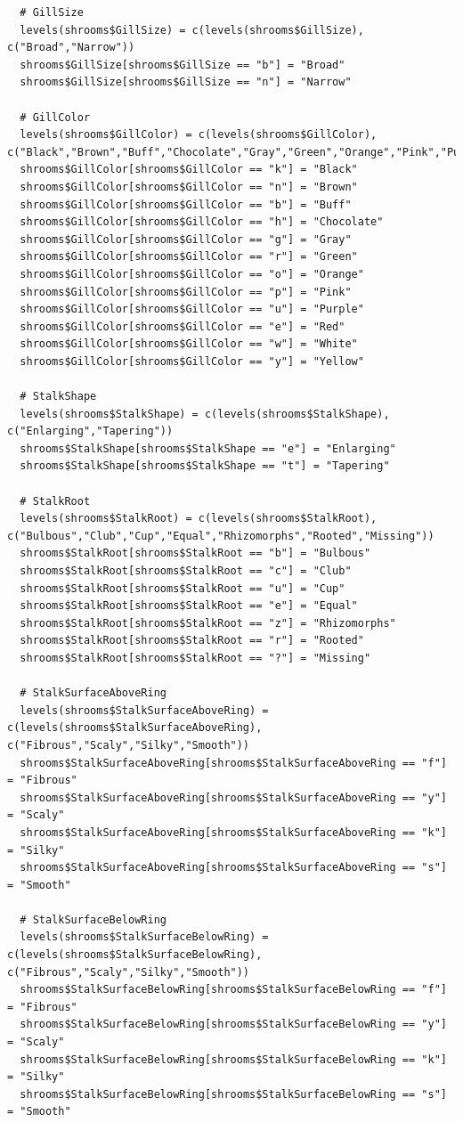\documentclass[10pt  ,usenames, dvipsnames]{article}\usepackage[]{graphicx}\usepackage[]{color}
\begin{document}
\begin{lstlisting}
  # GillSize
  levels(shrooms$GillSize) = c(levels(shrooms$GillSize), c("Broad","Narrow"))
  shrooms$GillSize[shrooms$GillSize == "b"] = "Broad"
  shrooms$GillSize[shrooms$GillSize == "n"] = "Narrow"
  
  # GillColor
  levels(shrooms$GillColor) = c(levels(shrooms$GillColor), c("Black","Brown","Buff","Chocolate","Gray","Green","Orange","Pink","Purple","Red","White","Yellow"))
  shrooms$GillColor[shrooms$GillColor == "k"] = "Black"
  shrooms$GillColor[shrooms$GillColor == "n"] = "Brown"
  shrooms$GillColor[shrooms$GillColor == "b"] = "Buff"
  shrooms$GillColor[shrooms$GillColor == "h"] = "Chocolate"
  shrooms$GillColor[shrooms$GillColor == "g"] = "Gray"
  shrooms$GillColor[shrooms$GillColor == "r"] = "Green"
  shrooms$GillColor[shrooms$GillColor == "o"] = "Orange"
  shrooms$GillColor[shrooms$GillColor == "p"] = "Pink"
  shrooms$GillColor[shrooms$GillColor == "u"] = "Purple"
  shrooms$GillColor[shrooms$GillColor == "e"] = "Red"
  shrooms$GillColor[shrooms$GillColor == "w"] = "White"
  shrooms$GillColor[shrooms$GillColor == "y"] = "Yellow"
  
  # StalkShape
  levels(shrooms$StalkShape) = c(levels(shrooms$StalkShape), c("Enlarging","Tapering"))
  shrooms$StalkShape[shrooms$StalkShape == "e"] = "Enlarging"
  shrooms$StalkShape[shrooms$StalkShape == "t"] = "Tapering"
  
  # StalkRoot
  levels(shrooms$StalkRoot) = c(levels(shrooms$StalkRoot), c("Bulbous","Club","Cup","Equal","Rhizomorphs","Rooted","Missing"))
  shrooms$StalkRoot[shrooms$StalkRoot == "b"] = "Bulbous"
  shrooms$StalkRoot[shrooms$StalkRoot == "c"] = "Club"
  shrooms$StalkRoot[shrooms$StalkRoot == "u"] = "Cup"
  shrooms$StalkRoot[shrooms$StalkRoot == "e"] = "Equal"
  shrooms$StalkRoot[shrooms$StalkRoot == "z"] = "Rhizomorphs"
  shrooms$StalkRoot[shrooms$StalkRoot == "r"] = "Rooted"
  shrooms$StalkRoot[shrooms$StalkRoot == "?"] = "Missing"
  
  # StalkSurfaceAboveRing
  levels(shrooms$StalkSurfaceAboveRing) = c(levels(shrooms$StalkSurfaceAboveRing), c("Fibrous","Scaly","Silky","Smooth"))
  shrooms$StalkSurfaceAboveRing[shrooms$StalkSurfaceAboveRing == "f"] = "Fibrous"
  shrooms$StalkSurfaceAboveRing[shrooms$StalkSurfaceAboveRing == "y"] = "Scaly"
  shrooms$StalkSurfaceAboveRing[shrooms$StalkSurfaceAboveRing == "k"] = "Silky"
  shrooms$StalkSurfaceAboveRing[shrooms$StalkSurfaceAboveRing == "s"] = "Smooth"
  
  # StalkSurfaceBelowRing
  levels(shrooms$StalkSurfaceBelowRing) = c(levels(shrooms$StalkSurfaceBelowRing), c("Fibrous","Scaly","Silky","Smooth"))
  shrooms$StalkSurfaceBelowRing[shrooms$StalkSurfaceBelowRing == "f"] = "Fibrous"
  shrooms$StalkSurfaceBelowRing[shrooms$StalkSurfaceBelowRing == "y"] = "Scaly"
  shrooms$StalkSurfaceBelowRing[shrooms$StalkSurfaceBelowRing == "k"] = "Silky"
  shrooms$StalkSurfaceBelowRing[shrooms$StalkSurfaceBelowRing == "s"] = "Smooth"
  

\end{lstlisting}
\end{document}
